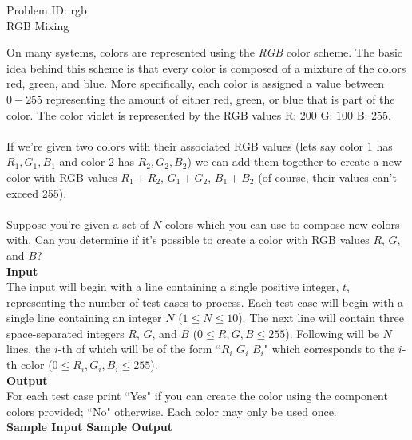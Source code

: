 \documentclass[a4paper,11pt]{article}
\begin{document}
\begin{center}
{\Huge Problem ID: rgb}\vspace{2 mm} \\	%
{\huge RGB Mixing}\vspace{2 mm} \\	%
\end{center}
\setcounter{page}{13}
\large{
On many systems, colors are represented using the \emph{RGB} color scheme. The basic idea behind this scheme is that every color is composed of a mixture of the colors red, green, and blue. More specifically, each color is assigned a value between $0-255$ representing the amount of either red, green, or blue that is part of the color. The color violet is represented by the RGB values R: $200$ G: $100$ B: $255$. \\\\
If we're given two colors with their associated RGB values (lets say color 1 has $R_1, G_1, B_1$ and color 2 has $R_2, G_2, B_2$) we can add them together to create a new color with RGB values $R_1+R_2$, $G_1+G_2$, $B_1+B_2$ (of course, their values can't exceed 255).\\\\
Suppose you're given a set of $N$ colors which you can use to compose new colors with. Can you determine if it's possible to create a color with RGB values $R$, $G$, and $B$?
}
\vspace{7mm}\\
\large{\bf{Input}}\vspace{2mm}\\
The input will begin with a line containing a single positive integer, $t$, representing the number of test cases to process. Each test case will begin with a single line containing an integer $N$ ($1 \leq N \leq 10$). The next line will contain three space-separated integers $R$, $G$, and $B$ ($0 \leq R, G, B \leq 255$). Following will be $N$ lines, the $i$-th of which will be of the form ``$R_i$ $G_i$ $B_i$" which corresponds to the $i$-th color ($0 \leq R_i, G_i, B_i \leq 255$).\vspace{3mm}\\
\large{\bf{Output}}\vspace{2mm}\\
For each test case print ``Yes" if you can create the color using the component colors provided; ``No" otherwise. Each color may only be used once.
\vspace{10mm}\\
{\bf{Sample Input}} \hspace{52mm} {\bf{Sample Output}}\vspace{1mm}\\
\end{document}
